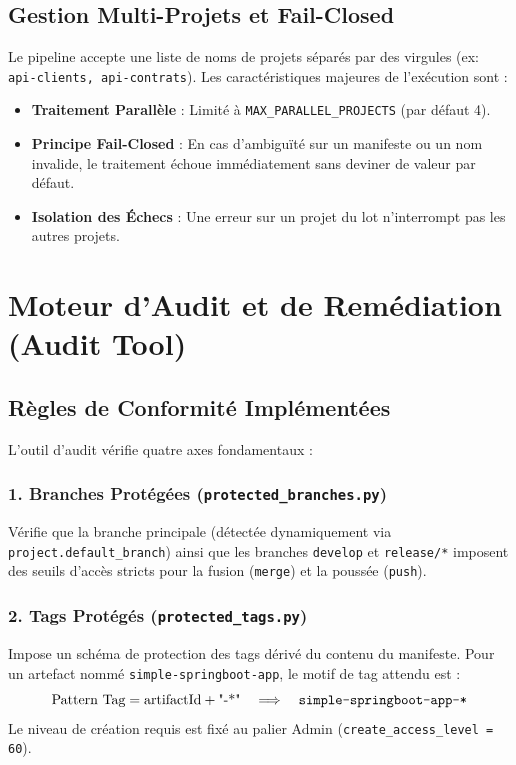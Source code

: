 \documentclass[12pt,a4paper]{report}
\begin{document}
\section{Gestion Multi-Projets et Fail-Closed}
Le pipeline accepte une liste de noms de projets séparés par des virgules (ex: \texttt{api-clients, api-contrats}). Les caractéristiques majeures de l'exécution sont :
\begin{itemize}
    \item \textbf{Traitement Parallèle} : Limité à \texttt{MAX\_PARALLEL\_PROJECTS} (par défaut 4).
    \item \textbf{Principe Fail-Closed} : En cas d'ambiguïté sur un manifeste ou un nom invalide, le traitement échoue immédiatement sans deviner de valeur par défaut.
    \item \textbf{Isolation des Échecs} : Une erreur sur un projet du lot n'interrompt pas les autres projets.
\end{itemize}

\chapter{Moteur d'Audit et de Remédiation (Audit Tool)}

\section{Règles de Conformité Implémentées}
L'outil d'audit vérifie quatre axes fondamentaux :

\subsection{1. Branches Protégées (\texttt{protected\_branches.py})}
Vérifie que la branche principale (détectée dynamiquement via \texttt{project.default\_branch}) ainsi que les branches \texttt{develop} et \texttt{release/*} imposent des seuils d'accès stricts pour la fusion (\texttt{merge}) et la poussée (\texttt{push}).

\subsection{2. Tags Protégés (\texttt{protected\_tags.py})}
Impose un schéma de protection des tags dérivé du contenu du manifeste. Pour un artefact nommé \texttt{simple-springboot-app}, le motif de tag attendu est :
\begin{equation}
    \text{Pattern Tag} = \text{artifactId} + \text{"-*"} \quad \Longrightarrow \quad \text{\texttt{simple-springboot-app-*}}
\end{equation}
Le niveau de création requis est fixé au palier Admin (\texttt{create\_access\_level = 60}).
\end{document}

